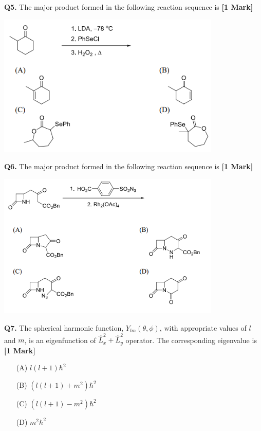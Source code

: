 \documentclass[11pt]{article}
\newcommand{\questiona}[2]{
    \noindent\textbf{Q#2.} #1 \hfill \textbf{[1 Mark]}
}
\begin{document}
\vspace{0.5cm}

\questiona{The major product formed in the following reaction sequence is}{5}
\begin{center}
\includegraphics[width=0.8\textwidth]{figures/5}
\end{center}

\vspace{0.5cm}

\questiona{The major product formed in the following reaction sequence is}{6}
\begin{center}
\includegraphics[width=0.8\textwidth]{figures/6.png}
\end{center}

\vspace{0.5cm}

\questiona{The spherical harmonic function, \( Y_{lm}(\theta,\phi) \), with appropriate values of \( l \) and \( m \), is an eigenfunction of \( \hat{L}_x^2 + \hat{L}_y^2 \) operator. The corresponding eigenvalue is}{7}
\begin{enumerate}
    \item[(A)] \( l(l+1)\hbar^2 \)
    \item[(B)] \( \left( l(l+1)+m^2 \right) \hbar^2 \)
    \item[(C)] \( \left( l(l+1)-m^2 \right) \hbar^2 \)
    \item[(D)] \( m^2\hbar^2 \)
\end{enumerate}
\vspace{0.5cm}
\end{document}
